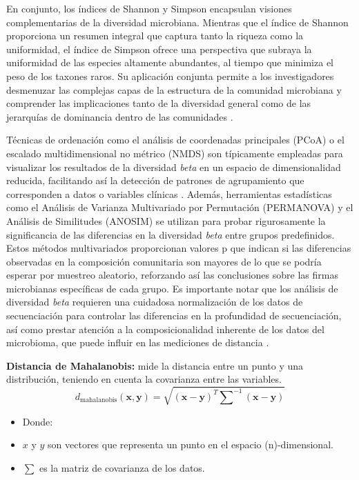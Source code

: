 En conjunto, los índices de Shannon y Simpson encapsulan visiones complementarias de la diversidad microbiana. Mientras que el índice de Shannon proporciona un resumen integral que captura tanto la riqueza como la uniformidad, el índice de Simpson ofrece una perspectiva que subraya la uniformidad de las especies altamente abundantes, al tiempo que minimiza el peso de los taxones raros. Su aplicación conjunta permite a los investigadores desmenuzar las complejas capas de la estructura de la comunidad microbiana y comprender las implicaciones tanto de la diversidad general como de las jerarquías de dominancia dentro de las comunidades \cite{kleine2021data}.




Técnicas de ordenación como el análisis de coordenadas principales (PCoA) o el escalado multidimensional no métrico (NMDS) son típicamente empleadas para visualizar los resultados de la diversidad \textit{beta} en un espacio de dimensionalidad reducida, facilitando así la detección de patrones de agrupamiento que corresponden a datos o variables clínicas \cite{knight2018best}. Además, herramientas estadísticas como el Análisis de Varianza Multivariado por Permutación (PERMANOVA) y el Análisis de Similitudes (ANOSIM) se utilizan para probar rigurosamente la significancia de las diferencias en la diversidad \textit{beta} entre grupos predefinidos. Estos métodos multivariados proporcionan valores p que indican si las diferencias observadas en la composición comunitaria son mayores de lo que se podría esperar por muestreo aleatorio, reforzando así las conclusiones sobre las firmas microbianas específicas de cada grupo. Es importante notar que los análisis de diversidad \textit{beta} requieren una cuidadosa normalización de los datos de secuenciación para controlar las diferencias en la profundidad de secuenciación, así como prestar atención a la composicionalidad inherente de los datos del microbioma, que puede influir en las mediciones de distancia \cite{knight2018best}.


\textbf{Distancia de Mahalanobis:} mide la distancia entre un punto y una distribución, teniendo en cuenta la covarianza entre las variables.
\begin{equation}
d_{\text{mahalanobis}}(\mathbf{x}, \mathbf{y}) = \sqrt{(\mathbf{x} - \mathbf{y})^T \mathbf{\sum}^{-1} (\mathbf{x} - \mathbf{y})}
\end{equation}

\begin{itemize}
\item Donde:

\item $x$ y $y$ son vectores que representa un punto en el espacio (n)-dimensional.
\item $\sum$ es la matriz de covarianza de los datos.
\end{itemize} 

